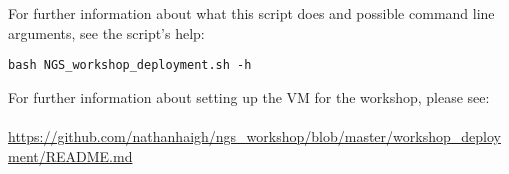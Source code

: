 For further information about what this script does and possible command line
arguments, see the script's help:
\begin{lstlisting}
bash NGS_workshop_deployment.sh -h
\end{lstlisting}


For further information about setting up the VM for the workshop, please see:
\\\\
\url{https://github.com/nathanhaigh/ngs_workshop/blob/master/workshop_deployment/README.md}
